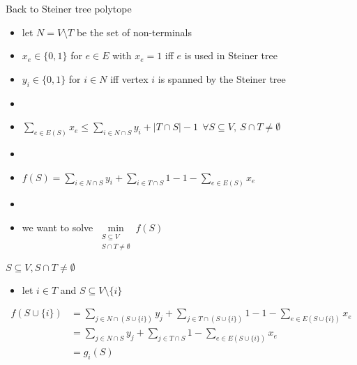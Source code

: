 \documentclass[usenames,dvipsnames]{beamer}
\begin{document}
\begin{frame}{Back to Steiner tree polytope}
  \begin{itemize}
  \item let $N = V \setminus T$ be the set of non-terminals
  \item $x_e \in \{0,1\}$ for $e \in E$ with $x_e = 1$ iff  $e$ is used in Steiner tree
  \item $y_i \in \{0,1\}$ for $i \in N$ iff vertex $i$ is spanned by the Steiner tree
  \item[]
  \item $\sum\limits_{e \in E(S)} x_e \leq \sum\limits_{i \in N \cap S} y_i + |T \cap S| -1~~\forall S \subseteq V,~S \cap T \neq \emptyset$
  \item[]
  \item $f(S) =  \sum\limits_{i \in N \cap S} y_i + \sum\limits_{i \in T \cap S} 1 - 1 - \sum\limits_{e \in E(S)} x_e$
  \item[]
    \item we want to solve $\min\limits_{\substack{S \subseteq V\\S \cap T \neq \emptyset}} f(S)$
  \end{itemize}
\end{frame}



\begin{frame}{$S \subseteq V, S \cap T \neq \emptyset$}
  \begin{itemize}
  \item let $i \in T$ and $S \subseteq V \setminus \{i\}$
  \end{itemize}
  \begin{align*}f(S \cup \{i\}) &= \sum\limits_{j \in N \cap (S \cup \{i\})} y_j + \sum\limits_{j \in T \cap (S \cup \{i\})} 1 - 1 - \sum\limits_{e \in E(S \cup \{i\})} x_e \\
    &= \sum\limits_{j \in N \cap S} y_j + \sum\limits_{j \in T \cap S} 1 - \sum\limits_{e \in E(S \cup \{i\})} x_e \\
    &= g_i(S)
  \end{align*}
\end{frame}
\end{document}
